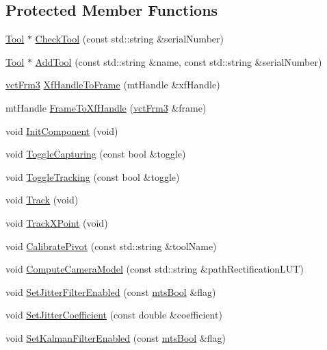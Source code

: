 \subsection*{Protected Member Functions}
\begin{DoxyCompactItemize}
\item 
\hyperlink{classmts_micron_tracker_1_1_tool}{Tool} $\ast$ \hyperlink{classmts_micron_tracker_adc762fa38ce5b3e17ca2a3e5fb0b0a2f}{Check\-Tool} (const std\-::string \&serial\-Number)
\item 
\hyperlink{classmts_micron_tracker_1_1_tool}{Tool} $\ast$ \hyperlink{classmts_micron_tracker_a37185584e886acc8eb0c64a0f0df6db1}{Add\-Tool} (const std\-::string \&name, const std\-::string \&serial\-Number)
\item 
\hyperlink{vct_transformation_types_8h_a81feda0a02c2d1bc26e5553f409fed20}{vct\-Frm3} \hyperlink{classmts_micron_tracker_a16293b87d3b8279bc47f0b14436ab675}{Xf\-Handle\-To\-Frame} (mt\-Handle \&xf\-Handle)
\item 
mt\-Handle \hyperlink{classmts_micron_tracker_a6834e7f374015273b69c271be84ef979}{Frame\-To\-Xf\-Handle} (\hyperlink{vct_transformation_types_8h_a81feda0a02c2d1bc26e5553f409fed20}{vct\-Frm3} \&frame)
\item 
void \hyperlink{classmts_micron_tracker_abe43aa3d73c585e9a770ae36dbe96e5e}{Init\-Component} (void)
\item 
void \hyperlink{classmts_micron_tracker_a418289b9dceaa16fd75e7d9d552f73b4}{Toggle\-Capturing} (const bool \&toggle)
\item 
void \hyperlink{classmts_micron_tracker_a366ff39dc5527beef64cb7be010e4331}{Toggle\-Tracking} (const bool \&toggle)
\item 
void \hyperlink{classmts_micron_tracker_a65d559a278d31edb4221d2c2c6a5318e}{Track} (void)
\item 
void \hyperlink{classmts_micron_tracker_a6c94408f53045f9e2675c4c22886e226}{Track\-X\-Point} (void)
\item 
void \hyperlink{classmts_micron_tracker_af7ec93da8da972d08ea95a401fd44571}{Calibrate\-Pivot} (const std\-::string \&tool\-Name)
\item 
void \hyperlink{classmts_micron_tracker_a591af1616ff00127d8b3ff4532193dd0}{Compute\-Camera\-Model} (const std\-::string \&path\-Rectification\-L\-U\-T)
\item 
void \hyperlink{classmts_micron_tracker_a0f575ab025ad605f79976bc1093c79d0}{Set\-Jitter\-Filter\-Enabled} (const \hyperlink{mts_generic_object_proxy_8h_ae2e26261f1874d4aa4ee374ece7646bd}{mts\-Bool} \&flag)
\item 
void \hyperlink{classmts_micron_tracker_a7185deb821ff2365d8fa91b5484a935a}{Set\-Jitter\-Coefficient} (const double \&coefficient)
\item 
void \hyperlink{classmts_micron_tracker_adb8a22a24b5339817407ecf14f93a7e3}{Set\-Kalman\-Filter\-Enabled} (const \hyperlink{mts_generic_object_proxy_8h_ae2e26261f1874d4aa4ee374ece7646bd}{mts\-Bool} \&flag)
\end{DoxyCompactItemize}
